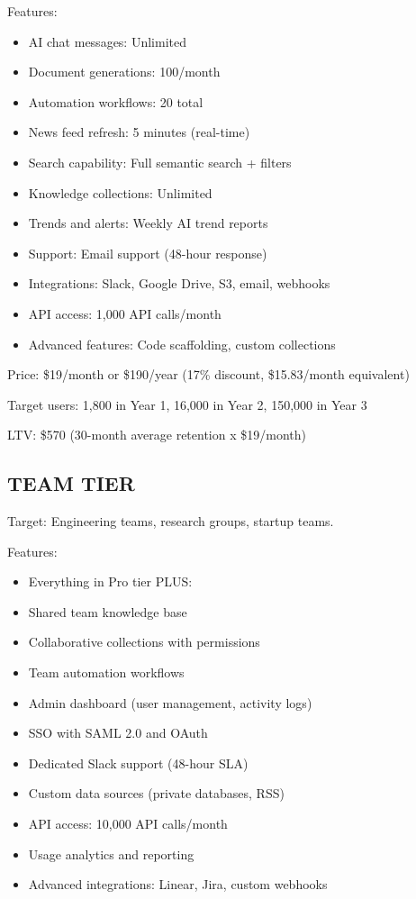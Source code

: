 \documentclass{report}
\begin{document}
Features:
\begin{itemize}
    \item AI chat messages: Unlimited
    \item Document generations: 100/month
    \item Automation workflows: 20 total
    \item News feed refresh: 5 minutes (real-time)
    \item Search capability: Full semantic search + filters
    \item Knowledge collections: Unlimited
    \item Trends and alerts: Weekly AI trend reports
    \item Support: Email support (48-hour response)
    \item Integrations: Slack, Google Drive, S3, email, webhooks
    \item API access: 1,000 API calls/month
    \item Advanced features: Code scaffolding, custom collections
\end{itemize}

Price: \$19/month or \$190/year (17\% discount, \$15.83/month equivalent)

Target users: 1,800 in Year 1, 16,000 in Year 2, 150,000 in Year 3

LTV: \$570 (30-month average retention x \$19/month)

\subsection{TEAM TIER}

Target: Engineering teams, research groups, startup teams.

Features:
\begin{itemize}
    \item Everything in Pro tier PLUS:
    \item Shared team knowledge base
    \item Collaborative collections with permissions
    \item Team automation workflows
    \item Admin dashboard (user management, activity logs)
    \item SSO with SAML 2.0 and OAuth
    \item Dedicated Slack support (48-hour SLA)
    \item Custom data sources (private databases, RSS)
    \item API access: 10,000 API calls/month
    \item Usage analytics and reporting
    \item Advanced integrations: Linear, Jira, custom webhooks
\end{itemize}
\end{document}
